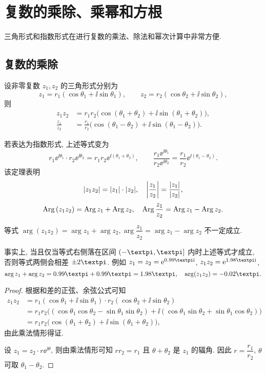 \section{复数的乘除、乘幂和方根}

三角形式和指数形式在进行复数的乘法、除法和幂次计算中非常方便.

\subsection{复数的乘除}

\begin{theorem}
  \label{thm:multiply}
  设非零复数 $z_1,z_2$ 的三角形式分别为
  \[
    z_1=r_1(\cos\theta_1+\ii\sin\theta_1),\qquad
    z_2=r_2(\cos\theta_2+\ii\sin\theta_2),
  \]
  则
  \begin{align*}
     z_1z_2&
    =r_1r_2\bigl(\cos(\theta_1+\theta_2)+\ii\sin(\theta_1+\theta_2)\bigr),\\
     \frac{z_1}{z_2}&
    =\frac{r_1}{r_2}\bigl(\cos(\theta_1-\theta_2)+\ii\sin(\theta_1-\theta_2)\bigr).
  \end{align*}
\end{theorem}

若表达为指数形式, 上述等式变为
  \[
    r_1\ee^{\ii\theta_1}\cdot r_2\ee^{\ii\theta_2}=r_1r_2\ee^{\ii(\theta_1+\theta_2)},\qquad
    \frac{r_1\ee^{\ii\theta_1}}{r_2\ee^{\ii\theta_2}}=\frac{r_1}{r_2}\ee^{\ii(\theta_1-\theta_2)}.
  \]
该定理表明
\[
  \lvert z_1z_2\rvert=\lvert z_1\rvert\cdot\lvert z_2\rvert,\quad
  \biggl\vert\frac{z_1}{z_2}\biggr\vert=\frac{\lvert z_1\rvert}{\lvert z_2\rvert},
\]
\begin{equation}
  \label{eq:Arg-multiply-divide-equality}
  \operatorname{Arg}{(z_1z_2)}=\operatorname{Arg} z_1+\operatorname{Arg} z_2,\quad
  \operatorname{Arg}{\frac{z_1}{z_2}}=\operatorname{Arg} z_1-\operatorname{Arg} z_2.
\end{equation}

\begin{marker}
  等式 $\arg{(z_1z_2)}=\arg z_1+\arg z_2, \arg{\dfrac{z_1}{z_2}}=\arg z_1-\arg z_2$ 不一定成立.
\end{marker}

事实上, 当且仅当等式右侧落在区间 $(-\cpi,\cpi]$ 内时上述等式才成立, 否则等式两侧会相差 $\pm2\cpi$.
例如 $z_1=z_2=\ee^{0.99\cpi \ii}$, $z_1z_2=\ee^{1.98\cpi \ii}$,
\[
  \arg z_1+\arg z_2=0.99\cpi+0.99\cpi=1.98\cpi,\quad
  \arg(z_1z_2)=-0.02\cpi.
\]

\begin{proof}
  根据和差的正弦、余弦公式可知
  \begin{align*}
     z_1z_2&
    =r_1(\cos\theta_1+\ii\sin\theta_1)\cdot
     r_2(\cos\theta_2+\ii\sin\theta_2)\\&
    =r_1r_2\bigl(
       (\cos\theta_1\cos\theta_2-\sin\theta_1\sin\theta_2)
    +\ii(\cos\theta_1\sin\theta_2+\sin\theta_1\cos\theta_2)
     \bigr)\\&
    =r_1r_2\bigl(
      \cos(\theta_1+\theta_2)+\ii\sin(\theta_1+\theta_2)
     \bigr),
  \end{align*}
  由此乘法情形得证.

  设 $z_1=z_2\cdot r\ee^{\ii\theta}$, 则由乘法情形可知 $rr_2=r_1$ 且 $\theta+\theta_2$ 是 $z_1$ 的辐角.
  因此 $r=\dfrac{r_1}{r_2}$, $\theta$ 可取 $\theta_1-\theta_2$.
\end{proof}



